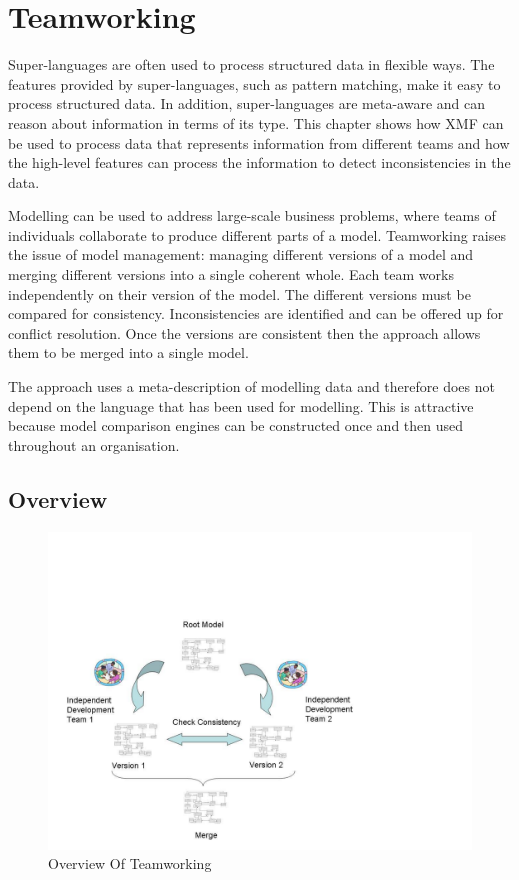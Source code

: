 
\chapter{Teamworking}

Super-languages are often used to process structured data in flexible
ways. The features provided by super-languages, such as pattern matching,
make it easy to process structured data. In addition, super-languages
are meta-aware and can reason about information in terms of its type.
This chapter shows how XMF can be used to process data that represents
information from different teams and how the high-level features can
process the information to detect inconsistencies in the data.

Modelling can be used to address large-scale business problems, where
teams of individuals collaborate to produce different parts of a model.
Teamworking raises the issue of model management: managing different
versions of a model and merging different versions into a single coherent
whole. Each team works independently on their version of the model.
The different versions must be compared for consistency. Inconsistencies
are identified and can be offered up for conflict resolution. Once
the versions are consistent then the approach allows them to be merged
into a single model.

The approach uses a meta-description of modelling data and therefore
does not depend on the language that has been used for modelling.
This is attractive because model comparison engines can be constructed
once and then used throughout an organisation.


\section{Overview}

%
\begin{figure}
\begin{center}

\includegraphics[width=12cm]{Programming/Teams/Images/Teamworking.pdf}

\caption{Overview Of Teamworking\label{fig:Overview-Of-Teamworking}}

\end{center}
\end{figure}


